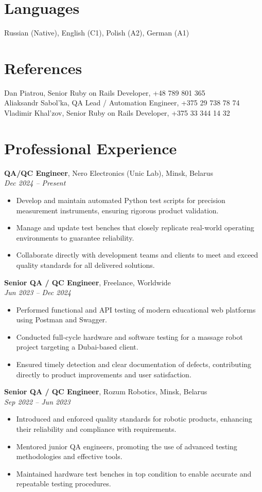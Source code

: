 \documentclass[11pt,a4paper]{article}
\begin{document}
\section*{Languages}
Russian (Native), English (C1), Polish (A2), German (A1)

\section*{References}
Dan Piatrou, Senior Ruby on Rails Developer, +48 789 801 365 \\
Aliaksandr Sabol'ka, QA Lead / Automation Engineer, +375 29 738 78 74 \\
Vladimir Khal'zov, Senior Ruby on Rails Developer, +375 33 344 14 32

\section*{Professional Experience}

\textbf{QA/QC Engineer}, Nero Electronics (Unic Lab), Minsk, Belarus \\
\textit{Dec 2024 -- Present}
\begin{itemize}
  \item Develop and maintain automated Python test scripts for precision measurement instruments, ensuring rigorous product validation.
  \item Manage and update test benches that closely replicate real-world operating environments to guarantee reliability.
  \item Collaborate directly with development teams and clients to meet and exceed quality standards for all delivered solutions.
\end{itemize}

\textbf{Senior QA / QC Engineer}, Freelance, Worldwide \\
\textit{Jun 2023 -- Dec 2024}
\begin{itemize}
  \item Performed functional and API testing of modern educational web platforms using Postman and Swagger.
  \item Conducted full-cycle hardware and software testing for a massage robot project targeting a Dubai-based client.
  \item Ensured timely detection and clear documentation of defects, contributing directly to product improvements and user satisfaction.
\end{itemize}

\textbf{Senior QA / QC Engineer}, Rozum Robotics, Minsk, Belarus \\
\textit{Sep 2022 -- Jun 2023}
\begin{itemize}
  \item Introduced and enforced quality standards for robotic products, enhancing their reliability and compliance with requirements.
  \item Mentored junior QA engineers, promoting the use of advanced testing methodologies and effective tools.
  \item Maintained hardware test benches in top condition to enable accurate and repeatable testing procedures.
\end{itemize}
\end{document}
